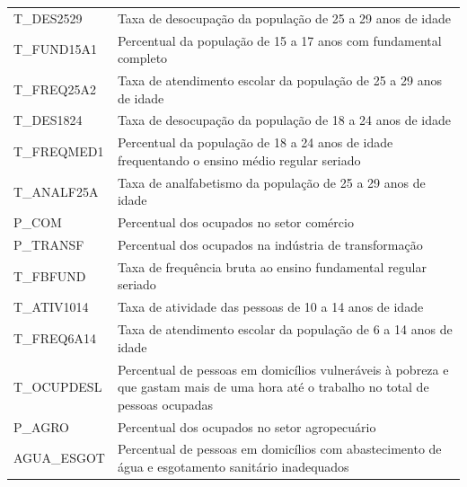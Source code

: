 \begin{table}[h]
\begin{tabularx}{\textwidth}{lX}
T\_DES2529 & Taxa de desocupação da população de 25 a 29 anos de idade\\
T\_FUND15A1 & Percentual da população de 15 a 17 anos com fundamental completo\\
T\_FREQ25A2 & Taxa de atendimento escolar da população de 25 a 29 anos de idade\\
T\_DES1824 & Taxa de desocupação da população de 18 a 24 anos de idade\\
T\_FREQMED1 & Percentual da população de 18 a 24 anos de idade frequentando o ensino médio regular seriado\\
T\_ANALF25A & Taxa de analfabetismo da população de 25 a 29 anos de idade\\
P\_COM & Percentual dos ocupados no setor comércio\\
P\_TRANSF & Percentual dos ocupados na indústria de transformação\\
T\_FBFUND & Taxa de frequência bruta ao ensino fundamental regular seriado\\
T\_ATIV1014 & Taxa de atividade das pessoas de 10 a  14 anos de idade\\
T\_FREQ6A14 & Taxa de atendimento escolar da população de 6 a 14 anos de idade\\
T\_OCUPDESL & Percentual de pessoas em domicílios vulneráveis à pobreza e que gastam mais de uma hora até o trabalho no total de pessoas ocupadas\\
P\_AGRO & Percentual dos ocupados no setor agropecuário\\
AGUA\_ESGOT & Percentual de pessoas em domicílios com abastecimento de água e esgotamento sanitário inadequados\\
\bottomrule
\end{tabularx}
\end{table}